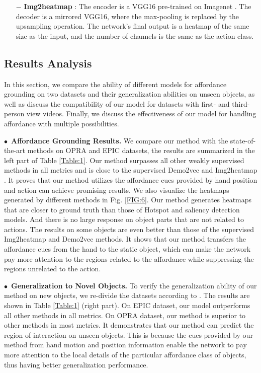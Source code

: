 \documentclass[journal,twoside]{IEEEtran}
\newcommand{\myPara}[1]{\vspace{5pt}\noindent$\bullet$~\textbf{#1} \quad}
\begin{document}
\begin{itemize}
\item [$\bm{-}$]
\textbf{Img2heatmap} \cite{interaction-hotspots}: The encoder is a VGG16 \cite{DBLP:journals/corr/SimonyanZ14a} pre-trained on Imagenet \cite{DBLP:conf/cvpr/DengDSLL009}. The decoder is a mirrored VGG16, where the max-pooling is replaced by the upsampling operation. The network's final output is a heatmap of the same size as the input, and the number of channels is the same as the action class.

\end{itemize}

\subsection{Results Analysis}
\label{results_analysis}
In this section, we compare the ability of different models for affordance grounding on two datasets and their generalization abilities on unseen objects, as well as discuss the compatibility of our model for datasets with first- and third-person view videos. Finally, we discuss the effectiveness of our model for handling affordance with multiple possibilities.

\myPara{Affordance Grounding Results.} 
We compare our method with the state-of-the-art methods on OPRA \cite{demo2vec2018cvpr} and EPIC \cite{Damen2018EPICKITCHENS} datasets, the results are summarized in the left part of Table \ref{Table:1}. Our method surpasses all other weakly supervised methods in all metrics and is close to the supervised Demo2vec \cite{demo2vec2018cvpr} and Img2heatmap \cite{interaction-hotspots}. It proves that our method utilizes the affordance cues provided by hand position and action can achieve promising results. We also visualize the heatmaps generated by different methods in Fig. \ref{FIG:6}. Our method generates heatmaps that are closer to ground truth than those of Hotspot and saliency detection models. And there is no large response on object parts that are not related to actions. The results on some objects are even better than those of the supervised Img2heatmap \cite{interaction-hotspots} and Demo2vec \cite{demo2vec2018cvpr} methods. It shows that our method transfers the affordance cues from the hand to the static object, which can make the network pay more attention to the regions related to the affordance while suppressing the regions unrelated to the action.

\myPara{Generalization to Novel Objects.}
To verify the generalization ability of our method on new objects, we re-divide the datasets according to \cite{interaction-hotspots}. The results are shown in Table \ref{Table:1} (right part). On EPIC \cite{Damen2018EPICKITCHENS} dataset, our model outperforms all other methods in all metrics. On OPRA \cite{demo2vec2018cvpr} dataset, our method is superior to other methods in most metrics. It demonstrates that our method can predict the region of interaction on unseen objects. This is because the cues provided by our method from hand motion and position information enable the network to pay more attention to the local details of the particular affordance class of objects, thus having better generalization performance.
\end{document}
